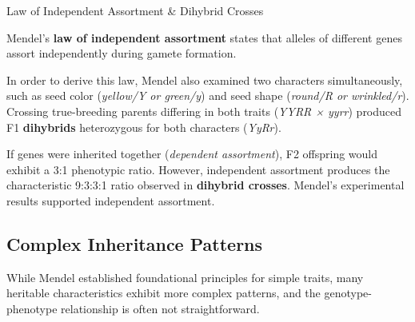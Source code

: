 \documentclass[10pt]{article}
\begin{document}
    \begin{core}{Law of Independent Assortment \& Dihybrid Crosses}

      Mendel's \textbf{law of independent assortment} states that alleles of different genes assort independently during gamete formation.


      In order to derive this law, Mendel also examined two characters simultaneously, such as seed color (\textit{yellow/Y or green/y}) and seed shape (\textit{round/R or wrinkled/r}). Crossing true-breeding parents differing in both traits (\textit{YYRR × yyrr}) produced F1 \textbf{dihybrids} heterozygous for both characters (\textit{YyRr}).

      If genes were inherited together (\textit{dependent assortment}), F2 offspring would exhibit a 3:1 phenotypic ratio. However, independent assortment produces the characteristic 9:3:3:1 ratio observed in \textbf{dihybrid crosses}. Mendel's experimental results supported independent assortment.

    \end{core}
  
  \subsection{Complex Inheritance Patterns}

    While Mendel established foundational principles for simple traits, many heritable characteristics exhibit more complex patterns, and the genotype-phenotype relationship is often not straightforward.
\end{document}
